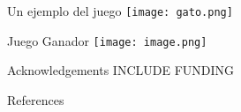 \documentclass{beamer}
\begin{document}
\begin{frame}{Un ejemplo del juego}
\texttt{[image: gato.png]}
\end{frame}
\begin{frame}{Juego Ganador}
\texttt{[image: image.png]}
\end{frame}
%
%

\begin{frame}{Acknowledgements}
  \centering
INCLUDE FUNDING

\end{frame}

\begin{frame}[allowframebreaks]{References}


\end{frame}

\end{document}
